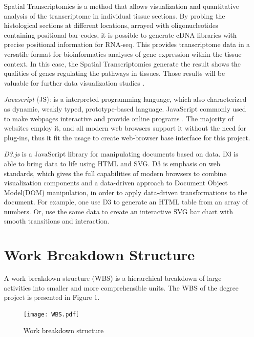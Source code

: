 \documentclass[a4paper]{article}
\begin{document}
Spatial Transcriptomics is a method that allows visualization and quantitative analysis of the transcriptome in individual tissue sections. By probing the histological sections at different locations, arrayed with oligonucleotides containing positional bar-codes, it is possible to generate cDNA libraries with precise positional information for RNA-seq. This provides transcriptome data in a versatile format for bioinformatics analyses of gene expression within the tissue context. In this case, the Spatial Transcriptomics generate the result shows the qualities of genes regulating the pathways in tissues. Those results will be valuable for further data visualization studies \cite{ST}.

\textit{Javascript} (JS): is a interpreted programming language, which also characterized as dynamic, weakly typed, prototype-based language. JavaScript commonly used to make webpages interactive and provide online programs  \cite{JA}. The majority of websites employ it, and all modern web browsers support it without the need for plug-ins, thus it fit the usage to create web-browser base interface for this project. 

\textit{D3.js} is a JavaScript library for manipulating documents based on data. D3 is able to bring data to life using HTML and SVG. D3 is emphasis on web standards, which gives the full capabilities of modern browsers to combine visualization components and a data-driven approach to Document Object Model(DOM) manipulation, in order to apply data-driven transformations to the document. For example, one use D3 to generate an HTML table from an array of numbers. Or, use the same data to create an interactive SVG bar chart with smooth transitions and interaction.

\section{Work Breakdown Structure}
A work breakdown structure (WBS) is a hierarchical breakdown of large activities into smaller and more comprehensible units. The WBS of the degree project is presented in Figure 1. 

\begin{figure}[h]
	\centering
	\texttt{[image: WBS.pdf]}
	\caption{Work breakdown structure}
\end{figure}
\end{document}
